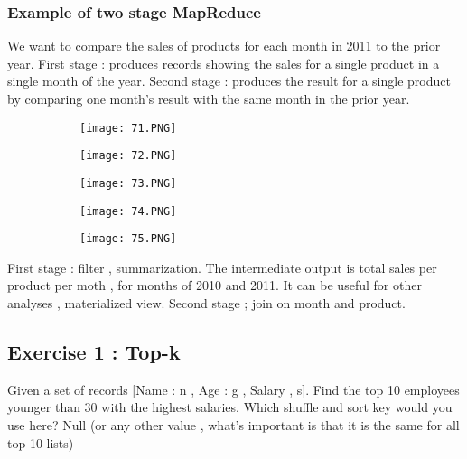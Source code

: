 \documentclass{article}
\begin{document}
\subsubsection{Example of two stage MapReduce}
We want to compare the sales of products for each month in 2011 to the prior year.
First stage : produces records showing the sales for a single product in a single month of the year.
Second stage : produces the result for a single product by comparing one month's result with the same month in the prior year.

\begin{figure}[ht!]
  \centering
  \begin{subfigure}[b]{0.5\linewidth}
    \texttt{[image: 71.PNG]}
  \end{subfigure}
\end{figure}

\begin{figure}[ht!]
  \centering
  \begin{subfigure}[b]{0.5\linewidth}
    \texttt{[image: 72.PNG]}
  \end{subfigure}
     \begin{subfigure}[b]{0.4\textwidth}
         \centering
         \texttt{[image: 73.PNG]}
     \end{subfigure}
\end{figure}

\begin{figure}[ht!]
  \centering
  \begin{subfigure}[b]{0.5\linewidth}
    \texttt{[image: 74.PNG]}
  \end{subfigure}
     \begin{subfigure}[b]{0.4\textwidth}
         \centering
         \texttt{[image: 75.PNG]}
     \end{subfigure}
\end{figure}

First stage : filter , summarization.
The intermediate output is total sales per product per moth , for months of 2010 and 2011.
It can be useful for other analyses , materialized view.
Second stage ; join on month and product.

\subsection{Exercise 1 : Top-k}

Given  a set of records [Name : n , Age : g , Salary , s].
Find the top 10 employees younger than 30 with the highest salaries.
Which shuffle and sort key would you use here? Null (or any other value , what's important is that it is the same for all top-10 lists)
\end{document}
